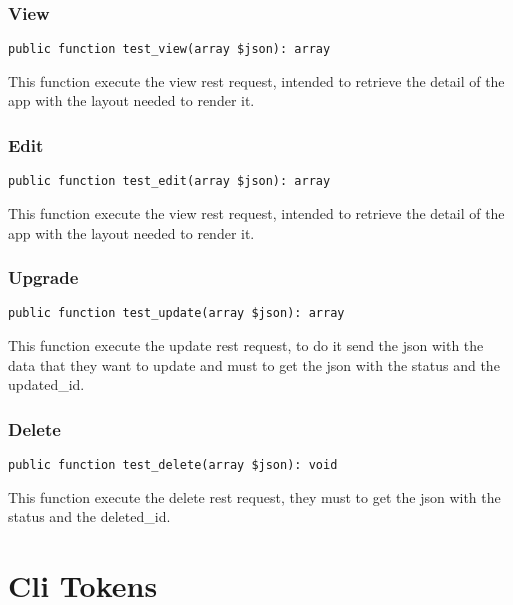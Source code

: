 \documentclass[a4paper]{article}
\begin{document}
\hypertarget{toc78}{}
\subsubsection{View}

\begin{lstlisting}
public function test_view(array $json): array
\end{lstlisting}

This function execute the view rest request, intended to retrieve the detail
of the app with the layout needed to render it.

\hypertarget{toc79}{}
\subsubsection{Edit}

\begin{lstlisting}
public function test_edit(array $json): array
\end{lstlisting}

This function execute the view rest request, intended to retrieve the detail
of the app with the layout needed to render it.

\hypertarget{toc80}{}
\subsubsection{Upgrade}

\begin{lstlisting}
public function test_update(array $json): array
\end{lstlisting}

This function execute the update rest request, to do it send the json with
the data that they want to update and must to get the json with the status
and the updated\_id.

\hypertarget{toc81}{}
\subsubsection{Delete}

\begin{lstlisting}
public function test_delete(array $json): void
\end{lstlisting}

This function execute the delete rest request, they must to get the json
with the status and the deleted\_id.


\hypertarget{toc82}{}
\section{Cli Tokens}
\end{document}
